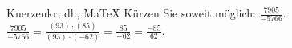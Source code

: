 \begin{MAufgabe}{Kuerzen}{kr, dh, MaTeX}
K\"urzen Sie soweit m\"oglich: $\frac{7905}{-5766}$.\\ 
\ifLsg\MLoesung
\quad $\frac{7905}{-5766}=\frac{(93)\cdot(85)}{(93)\cdot(-62)}=\frac{85}{-62}=\frac{-85}{62}$.\else\relax\fi
 \end{MAufgabe}